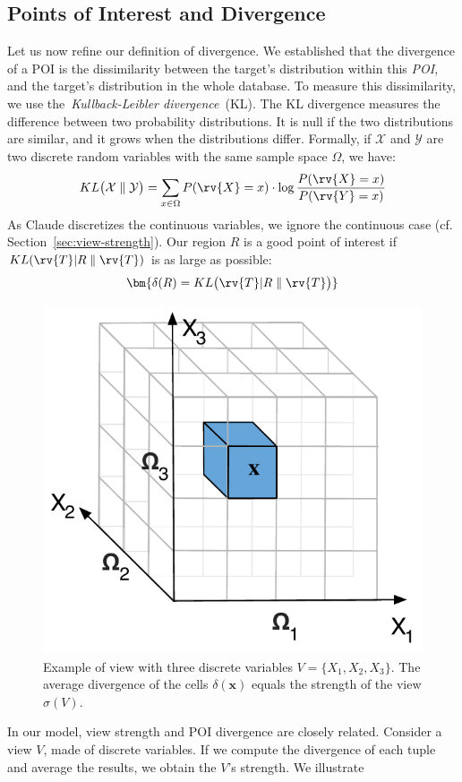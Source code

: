 \subsection{Points of Interest and Divergence}
Let us now refine our definition of divergence. We established that the
divergence of a POI is the dissimilarity between the target's distribution
within this \emph{POI}, and the target's distribution in the whole
database.  To measure this dissimilarity, we use the~\emph{Kullback-Leibler
divergence}~(KL).  The KL divergence measures the difference between two
probability distributions. It is null if the two distributions are similar, and
it grows when the distributions differ.  Formally, if $\mathcal{X}$ and
$\mathcal{Y}$ are two discrete random variables with the same sample space
$\Omega$, we have:
\begin{equation}\label{eq:KL_disc} 
    KL\big( \mathcal{X} \parallel \mathcal{Y} \big) = 
    \sum_{x\in \Omega} P(\rv{X} = x) \cdot \log{\frac{P(\rv{X} = x)}{P(\rv{Y} = x)}} 
\end{equation}
As Claude discretizes the continuous variables, we ignore the continuous case
(cf.  Section~\ref{sec:view-strength}). Our region $R$ is a good point of
interest if $KL ( \rv{T} |R \parallel \rv{T} )$ is as large as possible:
\begin{equation}\label{eq:divergence}\bm{
    \delta(R) = KL \big( \rv{T} | R \parallel \rv{T}\big)
}\end{equation}
\begin{figure}[t!]
\centering
\includegraphics[width=0.4\columnwidth]{images/3Dtest}
\caption{Example of view with three discrete variables $V = \{X_1, X_2, X_3\}$.
The average divergence of the cells $\delta(\mathbf{x})$ equals the strength of
the view  $\sigma(V)$.}
\label{fig:binningexample}
\end{figure}
In our model, view strength and POI divergence are closely related.  Consider a
view $V$, made of discrete variables. If we compute the divergence of each
tuple and average the results, we obtain the $V$'s strength.  We illustrate
